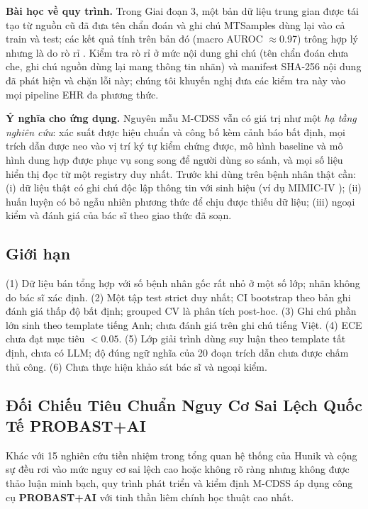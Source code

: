 \textbf{Bài học về quy trình.} Trong Giai đoạn 3, một bản dữ liệu trung gian được tái tạo từ nguồn cũ đã đưa tên chẩn đoán và ghi chú MTSamples dùng lại vào cả train và test; các kết quả tính trên bản đó (macro AUROC $\approx$0.97) trông hợp lý nhưng là do rò rỉ \cite{kapoor2023leakage}. Kiểm tra rò rỉ ở mức nội dung ghi chú (tên chẩn đoán chưa che, ghi chú nguồn dùng lại mang thông tin nhãn) và manifest SHA-256 nội dung đã phát hiện và chặn lỗi này; chúng tôi khuyến nghị đưa các kiểm tra này vào mọi pipeline EHR đa phương thức.

\textbf{Ý nghĩa cho ứng dụng.} Nguyên mẫu M-CDSS vẫn có giá trị như một \emph{hạ tầng nghiên cứu}: xác suất được hiệu chuẩn và công bố kèm cảnh báo bất định, mọi trích dẫn được neo vào vị trí ký tự kiểm chứng được, mô hình baseline và mô hình dung hợp được phục vụ song song để người dùng so sánh, và mọi số liệu hiển thị đọc từ một registry duy nhất. Trước khi dùng trên bệnh nhân thật cần: (i) dữ liệu thật có ghi chú độc lập thông tin với sinh hiệu (ví dụ MIMIC-IV \cite{johnson2023mimiciv}); (ii) huấn luyện có bỏ ngẫu nhiên phương thức để chịu được thiếu dữ liệu; (iii) ngoại kiểm và đánh giá của bác sĩ theo giao thức đã soạn.

\subsection{Giới hạn}
(1) Dữ liệu bán tổng hợp với số bệnh nhân gốc rất nhỏ ở một số lớp; nhãn không do bác sĩ xác định. (2) Một tập test strict duy nhất; CI bootstrap theo bản ghi đánh giá thấp độ bất định; grouped CV là phân tích post-hoc. (3) Ghi chú phần lớn sinh theo template tiếng Anh; chưa đánh giá trên ghi chú tiếng Việt. (4) ECE chưa đạt mục tiêu $<0.05$. (5) Lớp giải trình dùng suy luận theo template tất định, chưa có LLM; độ đúng ngữ nghĩa của 20 đoạn trích dẫn chưa được chấm thủ công. (6) Chưa thực hiện khảo sát bác sĩ và ngoại kiểm.

\subsection{Đối Chiếu Tiêu Chuẩn Nguy Cơ Sai Lệch Quốc Tế PROBAST+AI}
Khác với 15 nghiên cứu tiền nhiệm trong tổng quan hệ thống của Hunik và cộng sự \cite{hunik2024diagnostic} đều rơi vào mức nguy cơ sai lệch cao hoặc không rõ ràng nhưng không được thảo luận minh bạch, quy trình phát triển và kiểm định M-CDSS áp dụng công cụ \textbf{PROBAST+AI} \cite{probastai2024bmj} với tinh thần liêm chính học thuật cao nhất. 

